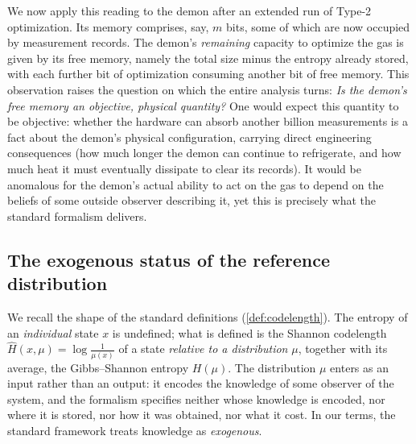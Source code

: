\documentclass[11pt]{article}
\begin{document}
We now apply this reading to the demon after an extended run of Type-2 optimization. Its memory comprises, say, $m$ bits, some of which are now occupied by measurement records. The demon's \emph{remaining} capacity to optimize the gas is given by its free memory, namely the total size minus the entropy already stored, with each further bit of optimization consuming another bit of free memory. This observation raises the question on which the entire analysis turns: \emph{Is the demon's free memory an objective, physical quantity?} One would expect this quantity to be objective: whether the hardware can absorb another billion measurements is a fact about the demon's physical configuration, carrying direct engineering consequences (how much longer the demon can continue to refrigerate, and how much heat it must eventually dissipate to clear its records). It would be anomalous for the demon's actual ability to act on the gas to depend on the beliefs of some outside observer describing it, yet this is precisely what the standard formalism delivers.

\subsection{The exogenous status of the reference distribution}
\label{sec:exogenous}

We recall the shape of the standard definitions (\cref{def:codelength}). The entropy of an \emph{individual} state $x$ is undefined; what is defined is the Shannon codelength $\hat H(x, \mu) = \log \frac{1}{\mu(x)}$ of a state \emph{relative to a distribution} $\mu$, together with its average, the Gibbs--Shannon entropy $H(\mu)$. The distribution $\mu$ enters as an input rather than an output: it encodes the knowledge of some observer of the system, and the formalism specifies neither whose knowledge is encoded, nor where it is stored, nor how it was obtained, nor what it cost. In our terms, the standard framework treats knowledge as \emph{exogenous}.
\end{document}
